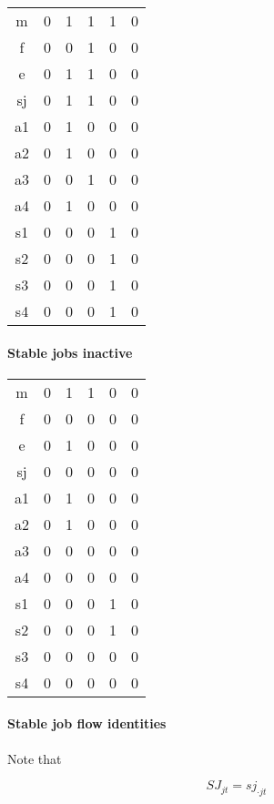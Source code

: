 \begin{tabular}{cccccc}
  m & 0 & 1 & 1 & 1 & 0 \\
  f & 0 & 0 & 1 & 0 & 0 \\
  e & 0 & 1 & 1 & 0 & 0 \\
 sj & 0 & 1 & 1 & 0 & 0 \\
\hline
 a1 & 0 & 1 & 0 & 0 & 0 \\
 a2 & 0 & 1 & 0 & 0 & 0 \\
 a3 & 0 & 0 & 1 & 0 & 0 \\
 a4 & 0 & 1 & 0 & 0 & 0 \\
\hline
 s1 & 0 & 0 & 0 & 1 & 0 \\
 s2 & 0 & 0 & 0 & 1 & 0 \\
 s3 & 0 & 0 & 0 & 1 & 0 \\
 s4 & 0 & 0 & 0 & 1 & 0 \\
\hline
\end{tabular}
\paragraph{Stable jobs inactive}

\begin{tabular}{cccccc}
  m & 0 & 1 & 1 & 0 & 0 \\
  f & 0 & 0 & 0 & 0 & 0 \\
  e & 0 & 1 & 0 & 0 & 0 \\
 sj & 0 & 0 & 0 & 0 & 0 \\
\hline
 a1 & 0 & 1 & 0 & 0 & 0 \\
 a2 & 0 & 1 & 0 & 0 & 0 \\
 a3 & 0 & 0 & 0 & 0 & 0 \\
 a4 & 0 & 0 & 0 & 0 & 0 \\
\hline
 s1 & 0 & 0 & 0 & 1 & 0 \\
 s2 & 0 & 0 & 0 & 1 & 0 \\
 s3 & 0 & 0 & 0 & 0 & 0 \\
 s4 & 0 & 0 & 0 & 0 & 0 \\
\hline
\end{tabular}

\paragraph{Stable job flow identities}

Note that 

\begin{equation}
SJ_{jt}=sj_{\cdot jt}
\end{equation}

